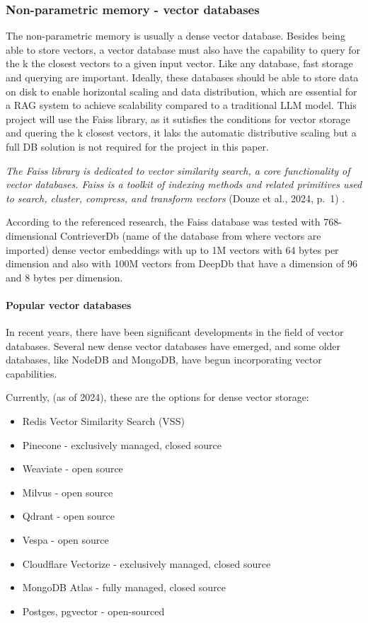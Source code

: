 \documentclass{wseas}
\begin{document}
    \subsubsection{Non-parametric memory - vector
databases}\label{non-parametric-memory---vector-databases}

The non-parametric memory is usually a dense vector database. Besides
being able to store vectors, a vector database must also have the
capability to query for the k the closest vectors to a given input
vector. Like any database, fast storage and querying are important.
Ideally, these databases should be able to store data on disk to enable
horizontal scaling and data distribution, which are essential for a RAG
system to achieve scalability compared to a traditional LLM model. This
project will use the Faiss library, as it sutisfies the conditions for
vector storage and quering the k closest vectors, it laks the automatic
distributive scaling but a full DB solution is not required for the
project in this paper.

\emph{The Faiss library is dedicated to vector similarity search, a core
functionality of vector databases. Faiss is a toolkit of indexing
methods and related primitives used to search, cluster, compress, and
transform vectors} (Douze et al., 2024, p.~1) \cite{cite2}.

According to the referenced research, the Faiss database was tested with
768-dimensional ContrieverDb (name of the database from where vectors
are imported) dense vector embeddings with up to 1M vectors with 64
bytes per dimension and also with 100M vectors from DeepDb that have a
dimension of 96 and 8 bytes per dimension.

\paragraph{Popular vector databases}\label{popular-vector-databases}

In recent years, there have been significant developments in the field
of vector databases. Several new dense vector databases have emerged,
and some older databases, like NodeDB and MongoDB, have begun
incorporating vector capabilities.

Currently, (as of 2024), these are the options for dense vector storage:

\begin{itemize}
\item
  Redis Vector Similarity Search (VSS)
\item
  Pinecone - exclusively managed, closed source
\item
  Weaviate - open source
\item
  Milvus - open source
\item
  Qdrant - open source
\item
  Vespa - open source
\item
  Cloudflare Vectorize - exclusively managed, closed source
\item
  MongoDB Atlas - fully managed, closed source
\item
  Postges, pgvector - open-sourced
\end{itemize}
\end{document}
